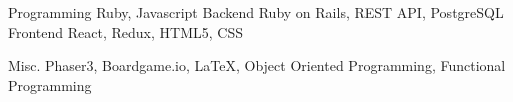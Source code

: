 \vspace{-1.0mm}

\begin{cvskills}

    \cvskill
    {Programming}
    {Ruby, Javascript} %
    \cvskill
    {Backend} %
    {Ruby on Rails, REST API, PostgreSQL} %
    \cvskill
    {Frontend} %
    {React, Redux, HTML5, CSS} %

    \cvskill
    {Misc.} %
    {Phaser3, Boardgame.io, LaTeX, Object Oriented Programming, Functional Programming} %

\end{cvskills}
